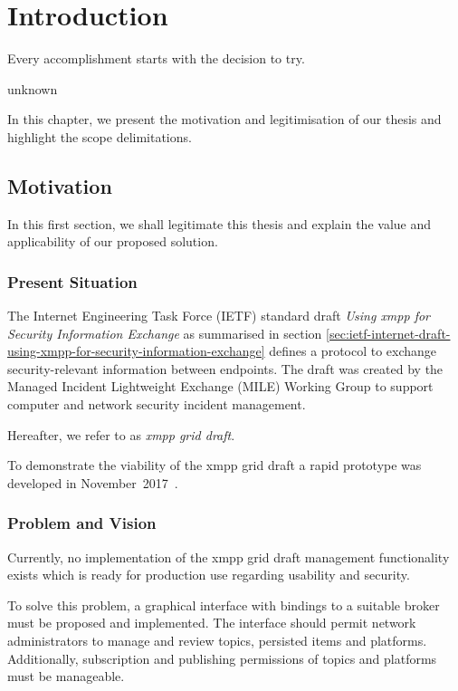 \newcommand{\code}{\texttt}
\chapter{Introduction}
\label{sec:introduction}

\epigraph{Every accomplishment starts with the decision to try.}{unknown}
In this chapter, we present the motivation and legitimisation of our thesis and highlight the scope delimitations.

\section{Motivation}
In this first section, we shall legitimate this thesis and explain the value and applicability of our proposed solution.

\subsection{Present Situation}
The Internet Engineering Task Force (IETF) standard draft \emph{Using \gls{xmpp} for Security Information Exchange} \cite{ietf-mile-xmpp-grid-05} as summarised in section \ref{sec:ietf-internet-draft-using-xmpp-for-security-information-exchange} defines a protocol to exchange security-relevant information between endpoints.
The draft was created by the Managed Incident Lightweight Exchange (MILE) Working Group to support computer and network security incident management.

Hereafter, we refer to  as \emph{\gls{xmpp} grid draft}.

To demonstrate the viability of the \gls{xmpp} grid draft a rapid prototype was developed in November~2017~\cite{xmpp-grid-prototype}.

\subsection{Problem and Vision}
Currently, no implementation of the \gls{xmpp} grid draft management functionality exists which is ready for production use regarding usability and security.

To solve this problem, a graphical interface with bindings to a suitable \gls{broker} must be proposed and implemented.
The interface should permit network administrators to manage and review \glspl{topic}, persisted items and \glspl{platform}.
Additionally, subscription and publishing permissions of \glspl{topic} and \glspl{platform} must be manageable.

